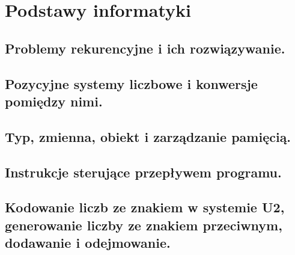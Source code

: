 \chapter{Podstawy informatyki}
\section{Problemy rekurencyjne i ich rozwiązywanie. }
\section{Pozycyjne systemy liczbowe i konwersje pomiędzy nimi. }
\section{Typ, zmienna, obiekt i zarządzanie pamięcią.}
\section{Instrukcje sterujące przepływem programu. }
\section{Kodowanie liczb ze znakiem w systemie U2, generowanie liczby ze znakiem przeciwnym, dodawanie i odejmowanie.}